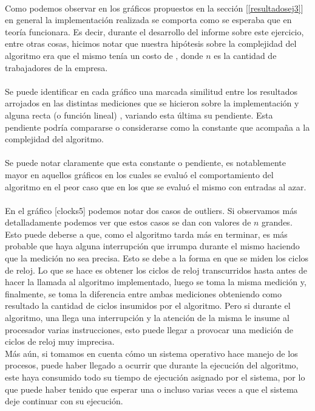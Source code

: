 \paragraph{}
Como podemos observar en los gráficos propuestos en la sección [\ref{resultadosej3}] en general la implementación realizada se comporta como se esperaba que en teoría funcionara. Es decir, durante el desarrollo del informe sobre este ejercicio, entre otras cosas, hicimos notar que nuestra hipótesis sobre la complejidad del algoritmo era que el mismo tenía un costo de , donde $n$ es la cantidad de trabajadores de la empresa.

\paragraph{}
Se puede identificar en cada gráfico una marcada similitud entre los resultados arrojados en las distintas mediciones que se hicieron sobre la implementación y alguna recta (o función lineal) , variando esta última su pendiente. Esta pendiente podría compararse o considerarse como la constante que acompa\~na a la complejidad del algoritmo.

\paragraph{}
Se puede notar claramente que esta constante o pendiente, es notablemente mayor en aquellos gráficos en los cuales se evaluó el comportamiento del algoritmo en el peor caso que en los que se evaluó el mismo con entradas al azar.

\paragraph{}
En el gráfico [clocks5] podemos notar dos casos de outliers. Si observamos más detalladamente podemos ver que estos casos se dan con valores de $n$ grandes. Esto puede deberse a que, como el algoritmo tarda más en terminar, es más probable que haya alguna interrupción que irrumpa durante el mismo haciendo que la medición no sea precisa. Esto se debe a la forma en que se miden los ciclos de reloj. Lo que se hace es obtener los ciclos de reloj transcurridos hasta antes de hacer la llamada al algoritmo implementado, luego se toma la misma medición y, finalmente, se toma la diferencia entre ambas mediciones obteniendo como resultado la cantidad de ciclos insumidos por el algoritmo. Pero si durante el algoritmo, una llega una interrupción y la atención de la misma le insume al procesador varias instrucciones, esto puede llegar a provocar una medición de ciclos de reloj muy imprecisa.\\
Más aún, si tomamos en cuenta cómo un sistema operativo hace manejo de los procesos, puede haber llegado a ocurrir que durante la ejecución del algoritmo, este haya consumido todo su tiempo de ejecución asignado por el sistema, por lo que puede haber tenido que esperar una o incluso varias veces a que el sistema deje continuar con su ejecución.



